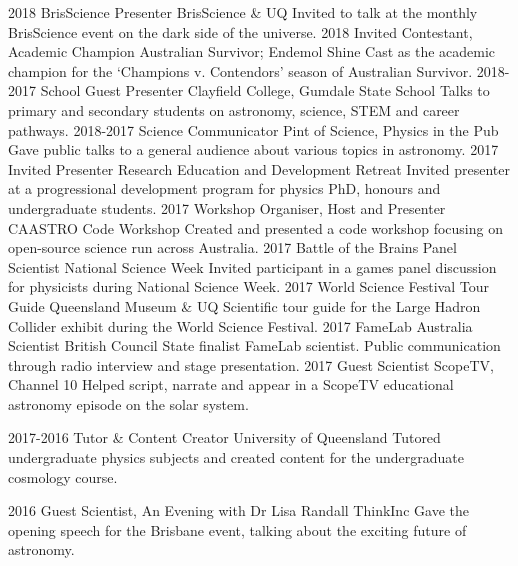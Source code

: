 \documentclass[]{friggeri-cv} %
\begin{document}
\begin{entrylist}
\entry
    {2018}
    {BrisScience Presenter}
    {BrisScience \& UQ}
    {Invited to talk at the monthly BrisScience event on the dark side of the universe.}
\entry
    {2018}
    {Invited Contestant, Academic Champion}
    {Australian Survivor; Endemol Shine}
    {Cast as the academic champion for the `Champions v. Contendors' season of Australian Survivor.}
\entry
    {2018-2017}
    {School Guest Presenter}
    {Clayfield College, Gumdale State School}
    {Talks to primary and secondary students on astronomy, science, STEM and career pathways.}
\entry
   {2018-2017}
   {Science Communicator}
   {Pint of Science, Physics in the Pub}
   {Gave public talks to a general audience about various topics in astronomy.}
\entry
    {2017}
    {Invited Presenter}
    {Research Education and Development Retreat}
    {Invited presenter at a progressional development program for physics PhD, honours and undergraduate students.}
\entry
    {2017}
    {Workshop Organiser, Host and Presenter}
    {CAASTRO Code Workshop}
    {Created and presented a code workshop focusing on open-source science run across Australia.}
\entry
    {2017}
    {Battle of the Brains Panel Scientist}
    {National Science Week}
    {Invited participant in a games panel discussion for physicists during National Science Week.}
\entry
    {2017}
    {World Science Festival Tour Guide}
    {Queensland Museum \& UQ}
    {Scientific tour guide for the Large Hadron Collider exhibit during the World Science Festival.}
\entry
    {2017}
    {FameLab Australia Scientist}
    {British Council}
    {State finalist FameLab scientist. Public communication through radio interview and stage presentation.}
\entry
    {2017}
    {Guest Scientist}
    {ScopeTV, Channel 10}
    {Helped script, narrate and appear in a ScopeTV educational astronomy episode on the solar system.}
\end{entrylist}
\begin{entrylist}
\entry
    {2017-2016}
    {Tutor \& Content Creator}
    {University of Queensland}
    {Tutored undergraduate physics subjects and created content for the undergraduate cosmology course.}
\end{entrylist}
\begin{entrylist}
\entry
    {2016}
    {Guest Scientist, An Evening with Dr Lisa Randall}
    {ThinkInc}
    {Gave the opening speech for the Brisbane event, talking about the exciting future of astronomy.}
\end{entrylist}
\end{document}
